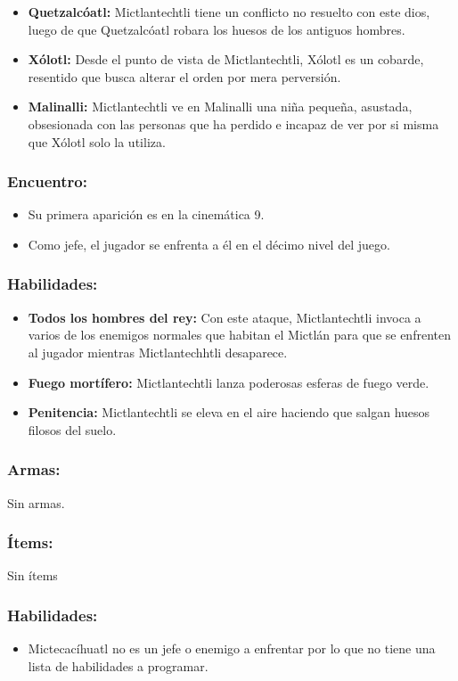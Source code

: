 \documentclass[11pt,letterpaper]{article}
\begin{document}
\begin{itemize}
\begin{itemize}
		\item \textbf{Quetzalcóatl:}  Mictlantechtli tiene un conflicto no resuelto con este dios, luego de que Quetzalcóatl robara los huesos de los antiguos hombres.
		\item \textbf{Xólotl:}  Desde el punto de vista de Mictlantechtli, Xólotl es un cobarde, resentido que busca alterar el orden por mera perversión.
		\item \textbf{Malinalli:}  Mictlantechtli ve en Malinalli una niña pequeña, asustada, obsesionada con las personas que ha perdido e incapaz de ver por si misma que Xólotl solo la utiliza. 
	\end{itemize}                     
\end{itemize}

\subsubsection{Encuentro:}
\begin{itemize}
	\item Su primera aparición es en la cinemática 9.
	\item Como jefe, el jugador se enfrenta a él en el décimo nivel del juego.
\end{itemize} 

\subsubsection{Habilidades:}
\begin{itemize}
	\item \textbf{Todos los hombres del rey:} Con este ataque,  Mictlantechtli invoca a varios de los enemigos normales que habitan el Mictlán para que se enfrenten al jugador mientras  Mictlantechhtli desaparece.
	\item \textbf{Fuego mortífero:}  Mictlantechtli  lanza poderosas esferas de fuego verde.
	\item \textbf{Penitencia:}  Mictlantechtli se eleva en el aire haciendo que salgan huesos filosos del suelo.
\end{itemize}  
\subsubsection{Armas:}
Sin armas.
\subsubsection{Ítems:}
Sin ítems
        \subsubsection{Habilidades:}
\begin{itemize}
	\item Mictecacíhuatl no es un jefe o enemigo a enfrentar por lo que no tiene una lista de habilidades a programar.
\end{itemize}  
\end{document}
